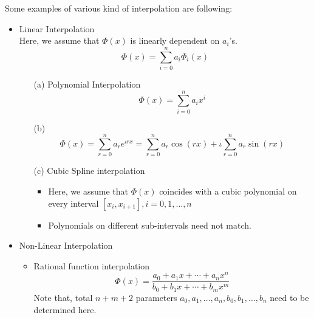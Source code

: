 \begin{example}
	Some examples of various kind of interpolation are following:
	\begin{itemize}
		\item Linear Interpolation
		      \\ Here, we assume that $ \Phi(x) $ is linearly dependent on $a_i$'s.
		      \[
			      \Phi(x) = \sum_{i=0}^{n}a_i\Phi_i(x)
		      \]
		      \begin{itemize}
			      \item[(a)] Polynomial Interpolation
				      \[\Phi(x) = \sum_{i=0}^{n}a_ix^i\]
			      \item[(b)] \[\Phi(x) = \sum_{r=0}^{n}a_re^{\iota rx} = \sum_{r=0}^{n}a_r\cos(rx) + \iota\sum_{r=0}^{n}a_r\sin(rx) \]
			      \item[(c)] Cubic Spline interpolation
				      \begin{itemize}
					      \item Here, we assume that $ \Phi(x) $ coincides with a cubic polynomial on every interval $ [x_i,x_{i+1}], i = 0,1,\ldots,n $
					      \item Polynomials on different sub-intervals need not match.
				      \end{itemize}
		      \end{itemize}
		\item Non-Linear Interpolation
		      \begin{itemize}
			      \item Rational function interpolation
			            \[
				            \Phi(x) = \frac{a_0+a_1x+\cdots+a_nx^n}{b_0+b_1x+\cdots+b_mx^m}
			            \]
			            Note that, total $ n+m+2 $ parameters $ a_0,a_1,\ldots,a_n,b_0,b_1,\ldots,b_n $ need to be determined here.
		      \end{itemize}
	\end{itemize}

\end{example}






